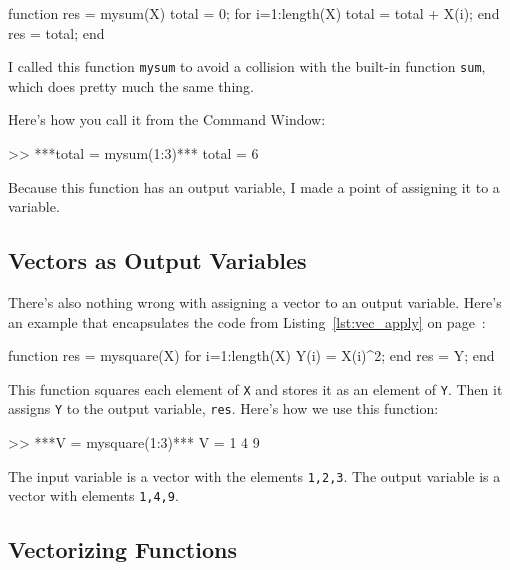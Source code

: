 
\begin{code}
function res = mysum(X)
    total = 0;
    for i=1:length(X)
        total = total + X(i);
    end
    res = total;
end
\end{code}

I called this function \lstinline{mysum} to avoid a collision with the built-in
function \lstinline{sum}, which does pretty much the same thing.


Here's how you call it from the Command Window:

\begin{code}
>> ***total = mysum(1:3)***
total = 6
\end{code}

Because this function has an output variable, I made a
point of assigning it to a variable.



\subsection{Vectors as Output Variables}

There's also nothing wrong with assigning a vector to an output
variable. Here's an example that encapsulates the code from
Listing~\ref{lst:vec_apply} on page~\pageref{lst:vec_apply}:

\begin{code}
function res = mysquare(X)
    for i=1:length(X)
        Y(i) = X(i)^2;
    end
    res = Y;
end
\end{code}

This function squares each element of \lstinline{X} and stores it as an element of \lstinline{Y}.  Then it assigns \lstinline{Y} to the output variable, \lstinline{res}.  Here's how we use this function:

\begin{code}
>> ***V = mysquare(1:3)***
V = 1     4     9
\end{code}

The input variable is a vector with the elements \lstinline{1,2,3}.  The output variable is a vector with elements \lstinline{1,4,9}.




\subsection{Vectorizing Functions}

